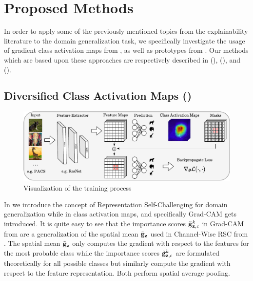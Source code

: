 \chapter{Proposed Methods}

In order to apply some of the previously mentioned topics from the explainability literature to the domain generalization task,  we specifically investigate the usage of gradient class activation maps from , as well as prototypes from . Our methods which are based upon these approaches are respectively described in  (\divcam),  (\prodrop), and  (\dtransformers).

\section{Diversified Class Activation Maps (\divcam)}
\label{sec:divcam}

\begin{figure}[t]
    \centering
    \includegraphics[width=\textwidth]{Figures/Chapter4/model_figure-cropped.pdf}
    \caption{Visualization of the \divcam training process}
    \label{fig:divcam-overview}
\end{figure}


In  we introduce the concept of Representation Self-Challenging for domain generalization while in  class activation maps, and specifically Grad-CAM gets introduced. It is quite easy to see that the importance scores $ \Tilde{\mathbf{g}}_{\mathbf{z},c}^k$ in Grad-CAM from  are a generalization of the spatial mean $\Tilde{\mathbf{g}}_\mathbf{z}$ used in Channel-Wise RSC from . The spatial mean $\Tilde{\mathbf{g}}_\mathbf{z}$ only computes the gradient with respect to the features for the most probable class while the importance scores $ \Tilde{\mathbf{g}}_{\mathbf{z},c}^k$ are formulated theoretically for all possible classes but similarly compute the gradient with respect to the feature representation. Both perform spatial average pooling.  

